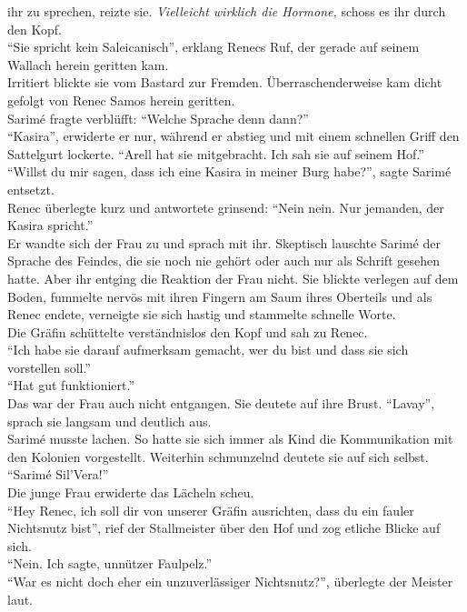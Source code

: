 ihr zu sprechen, reizte sie. \textit{Vielleicht wirklich die Hormone,} schoss es ihr durch den 
Kopf.\\
``Sie spricht kein Saleicanisch'', erklang Renecs Ruf, der gerade auf seinem Wallach herein 
geritten kam.\\
Irritiert blickte sie vom Bastard zur Fremden. Überraschenderweise kam dicht gefolgt von 
Renec Samos herein geritten.\\
Sarimé fragte verblüfft: ``Welche Sprache denn dann?''\\
``Kasira'', erwiderte er nur, während er abstieg und mit einem schnellen Griff den Sattelgurt 
lockerte. ``Arell hat sie mitgebracht. Ich sah sie auf seinem Hof.''\\
``Willst du mir sagen, dass ich eine Kasira in meiner Burg habe?'', sagte Sarimé entsetzt.\\
Renec überlegte kurz und antwortete grinsend: ``Nein nein. Nur jemanden, der Kasira spricht.''\\
Er wandte sich der Frau zu und sprach mit ihr. Skeptisch lauschte Sarimé der Sprache des Feindes, 
die sie noch nie gehört oder auch nur als Schrift gesehen hatte. Aber ihr entging die Reaktion der 
Frau nicht. Sie blickte verlegen auf dem Boden, fummelte nervös mit ihren Fingern am Saum ihres 
Oberteils und als Renec endete, verneigte sie sich hastig und stammelte schnelle Worte.\\
Die Gräfin schüttelte verständnislos den Kopf und sah zu Renec.\\
``Ich habe sie darauf aufmerksam gemacht, wer du bist und dass sie sich vorstellen soll.''\\
``Hat gut funktioniert.''\\
Das war der Frau auch nicht entgangen. Sie deutete auf ihre Brust. ``Lavay'', sprach sie langsam 
und deutlich aus.\\
Sarimé musste lachen. So hatte sie sich immer als Kind die Kommunikation mit den Kolonien 
vorgestellt. Weiterhin schmunzelnd deutete sie auf sich selbst. ``Sarimé Sil'Vera!''\\
Die junge Frau erwiderte das Lächeln scheu.\\
``Hey Renec, ich soll dir von unserer Gräfin ausrichten, dass du ein fauler Nichtsnutz bist'', rief 
der Stallmeister über den Hof und zog etliche Blicke auf sich.\\
``Nein. Ich sagte, unnützer Faulpelz.''\\
``War es nicht doch eher ein unzuverlässiger Nichtsnutz?'', überlegte der Meister laut.\\
